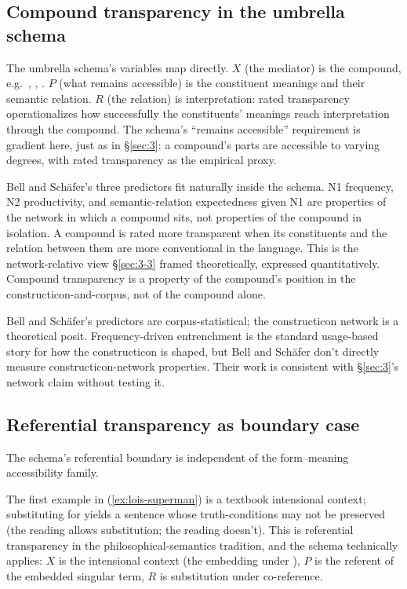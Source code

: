\subsection{Compound transparency in the umbrella schema}

The umbrella schema's variables map directly. $X$ (the mediator) is the compound, e.g.~, , . $P$ (what remains accessible) is the constituent meanings and their semantic relation. $R$ (the relation) is interpretation: rated transparency operationalizes how successfully the constituents' meanings reach interpretation through the compound. The schema's \enquote{remains accessible} requirement is gradient here, just as in §\ref{sec:3}: a compound's parts are accessible to varying degrees, with rated transparency as the empirical proxy.

Bell and Schäfer's three predictors fit naturally inside the schema. \textup{N1} frequency, \textup{N2} productivity, and semantic-relation expectedness given \textup{N1} are properties of the network in which a compound sits, not properties of the compound in isolation. A compound is rated more transparent when its constituents and the relation between them are more conventional in the language. This is the network-relative view §\ref{sec:3-3} framed theoretically, expressed quantitatively. Compound transparency is a property of the compound's position in the constructicon-and-corpus, not of the compound alone.

Bell and Schäfer's predictors are corpus-statistical; the constructicon network is a theoretical posit. Frequency-driven entrenchment is the standard usage-based story for how the constructicon is shaped, but Bell and Schäfer don't directly measure constructicon-network properties. Their work is consistent with §\ref{sec:3}'s network claim without testing it.

\subsection{Referential transparency as boundary case}\label{sec:4-3}

The schema's referential boundary is independent of the form--meaning accessibility family.

\ea\label{ex:lois-superman}
\ea {}
\ex {}
\z
\z

The first example in (\ref{ex:lois-superman}) is a textbook intensional context; substituting  for  yields a sentence whose truth-conditions may not be preserved (the  reading allows substitution; the  reading doesn't). This is referential transparency in the philosophical-semantics tradition, and the schema technically applies: $X$ is the intensional context (the embedding under ), $P$ is the referent of the embedded singular term, $R$ is substitution under co-reference.

